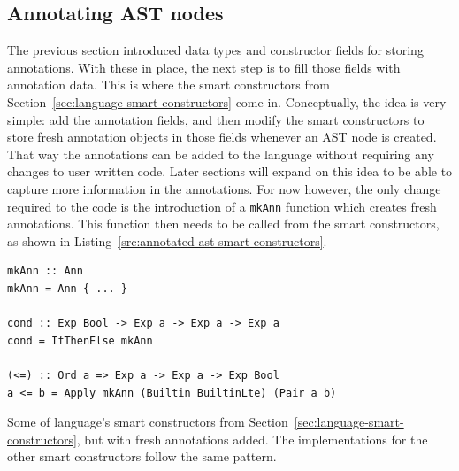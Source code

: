 \documentclass[fontsize=11pt,a4paper,parskip=half,numbers=noenddot]{scrartcl}
\newcommand{\hask}[1]{\texttt{#1}}
\begin{document}
\subsection{Annotating AST nodes}


The previous section introduced data types and constructor fields for storing
annotations. With these in place, the next step is to fill those fields with
annotation data. This is where the smart constructors from
Section~\ref{sec:language-smart-constructors} come in. Conceptually, the idea is
very simple: add the annotation fields, and then modify the smart constructors
to store fresh annotation objects in those fields whenever an AST node is
created. That way the annotations can be added to the language without requiring
any changes to user written code. Later sections will expand on this idea to be
able to capture more information in the annotations. For now however, the only
change required to the code is the introduction of a \hask{mkAnn} function which
creates fresh annotations. This function then needs to be called from the smart
constructors, as shown in Listing~\ref{src:annotated-ast-smart-constructors}.

\begin{listing}[!ht]
\begin{verbatim}
mkAnn :: Ann
mkAnn = Ann { ... }

cond :: Exp Bool -> Exp a -> Exp a -> Exp a
cond = IfThenElse mkAnn

(<=) :: Ord a => Exp a -> Exp a -> Exp Bool
a <= b = Apply mkAnn (Builtin BuiltinLte) (Pair a b)
\end{verbatim}
\caption{Some of language's smart constructors from Section~\ref{sec:language-smart-constructors}, but with fresh annotations added. The implementations for the other smart constructors follow the same pattern.}\label{src:annotated-ast-smart-constructors}
\end{listing}
\end{document}
